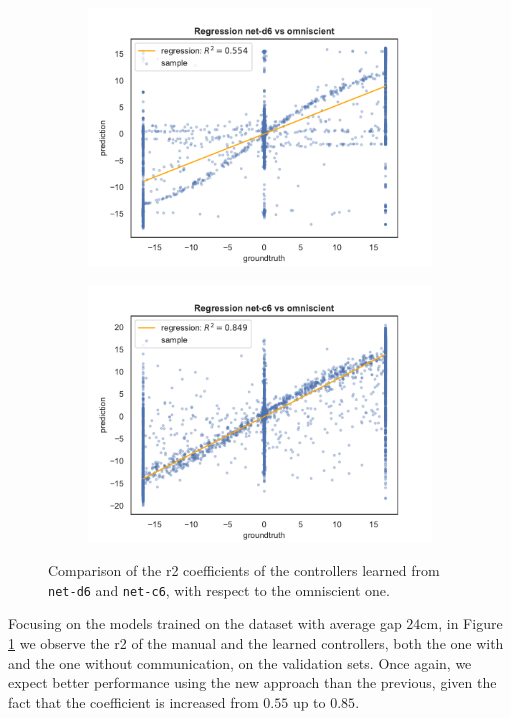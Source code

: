 \begin{figure}[!htb]
	\begin{center}
		\begin{subfigure}[h]{0.49\textwidth}
			\includegraphics[width=\textwidth]{contents/images/net-d6/regression-net-d6-vs-omniscient}%
		\end{subfigure}
		\hfill\vspace{-0.5cm}
		\begin{subfigure}[h]{0.49\textwidth}
			\includegraphics[width=\textwidth]{contents/images/net-c6/regression-net-c6-vs-omniscient}%
		\end{subfigure}
	\end{center}
	\caption[Evaluation of the \gls{r2} coefficients of \texttt{net-c6}.]{Comparison 
		of the \gls{r2} coefficients of the controllers learned from \texttt{net-d6} and 
		\texttt{net-c6}, with respect to the omniscient one.}
	\label{fig:net-c6r2}
\end{figure}
Focusing on the models trained on the dataset with average gap $24$\gls{cm}, in 
Figure \ref{fig:net-c6r2} we observe the \gls{r2} of the manual 
and the learned controllers, both the one with and the one without 
communication, on the validation sets.
Once again, we expect better performance using the new approach than the 
previous, given the fact that the coefficient is increased from $0.55$ up to $0.85$.

